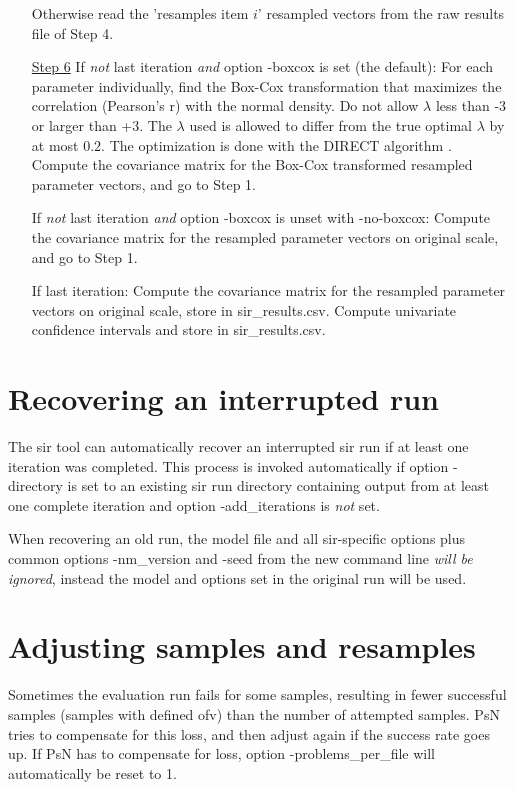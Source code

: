 \begin{itemize}
\noindent Otherwise read the 'resamples item $i$' resampled vectors from the raw results file of Step 4.
\item[\underline{Step 6}]
If \emph{not} last iteration \emph{and} option -boxcox is set (the default): For each parameter individually, find the Box-Cox transformation that maximizes the correlation (Pearson's r) with the normal density. Do not allow $\lambda$ less than -3 or larger than +3. The  $\lambda$ used is allowed to differ from the true optimal  $\lambda$ by at most $0.2$. The optimization is done with the DIRECT algorithm \cite{direct}. Compute the covariance matrix for the Box-Cox transformed resampled parameter vectors, and go to Step 1.

\noindent If \emph{not} last iteration \emph{and} option -boxcox is unset with -no-boxcox: Compute the covariance matrix for the resampled parameter vectors on original scale, and go to Step 1.

\noindent If last iteration:
Compute the covariance matrix for the resampled parameter vectors on original scale, store in sir\_results.csv. Compute univariate confidence intervals and store in sir\_results.csv.
\end{itemize}

\section{Recovering an interrupted run}
The sir tool can automatically recover an interrupted sir run if at least one iteration was completed. This process is invoked automatically if option -directory is set to an existing sir run directory containing output from at least one complete iteration and option -add\_iterations is \emph{not} set.

When recovering an old run, the model file and all sir-specific options plus common options -nm\_version and -seed from
the new command line \emph{will be ignored}, instead the model and options set in the original run will be used.

\section{Adjusting samples and resamples}
Sometimes the evaluation run fails for some samples, resulting in fewer successful samples (samples with defined ofv)
than the number of attempted samples. PsN tries to compensate for this loss, and then adjust again if the success rate goes up. If PsN has to compensate for loss, option -problems\_per\_file will automatically be reset to 1.
